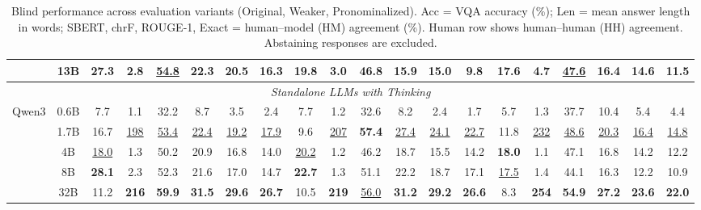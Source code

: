 \begin{table}[t]
{\begin{tabular}{lc|cccccc|cccccc|cccccc}
 & 13B & 27.3 & 2.8 & \underline{54.8} & 22.3 & 20.5 & 16.3 & 19.8 & 3.0 & 46.8 & 15.9 & 15.0 & 9.8 & 17.6 & 4.7 & \underline{47.6} & 16.4 & 14.6 & 11.5 \\
\midrule
\multicolumn{20}{c}{\textit{Standalone LLMs with Thinking}} \\
\midrule
\multirow{5}{*}{Qwen3} & 0.6B & 7.7 & 1.1 & 32.2 & 8.7 & 3.5 & 2.4 & 7.7 & 1.2 & 32.6 & 8.2 & 2.4 & 1.7 & 5.7 & 1.3 & 37.7 & 10.4 & 5.4 & 4.4 \\
 & 1.7B & 16.7 & \underline{198} & \underline{53.4} & \underline{22.4} & \underline{19.2} & \underline{17.9} & 9.6 & \underline{207} & \textbf{57.4} & \underline{27.4} & \underline{24.1} & \underline{22.7} & 11.8 & \underline{232} & \underline{48.6} & \underline{20.3} & \underline{16.4} & \underline{14.8} \\
 & 4B & \underline{18.0} & 1.3 & 50.2 & 20.9 & 16.8 & 14.0 & \underline{20.2} & 1.2 & 46.2 & 18.7 & 15.5 & 14.2 & \textbf{18.0} & 1.1 & 47.1 & 16.8 & 14.2 & 12.2 \\
 & 8B & \textbf{28.1} & 2.3 & 52.3 & 21.6 & 17.0 & 14.7 & \textbf{22.7} & 1.3 & 51.1 & 22.2 & 18.7 & 17.1 & \underline{17.5} & 1.4 & 44.1 & 16.3 & 12.2 & 10.9 \\
 & 32B & 11.2 & \textbf{216} & \textbf{59.9} & \textbf{31.5} & \textbf{29.6} & \textbf{26.7} & 10.5 & \textbf{219} & \underline{56.0} & \textbf{31.2} & \textbf{29.2} & \textbf{26.6} & 8.3 & \textbf{254} & \textbf{54.9} & \textbf{27.2} & \textbf{23.6} & \textbf{22.0} \\
\bottomrule
\end{tabular}
}
\caption{\small Blind performance across evaluation variants (Original, Weaker, Pronominalized). Acc = VQA accuracy (\%); Len = mean answer length in words; SBERT, chrF, ROUGE-1, Exact = human--model (HM) agreement (\%). Human row shows human--human (HH) agreement. Abstaining responses are excluded.}
\label{tab:comprehensive_inst_blind_filtered}
\end{table}
